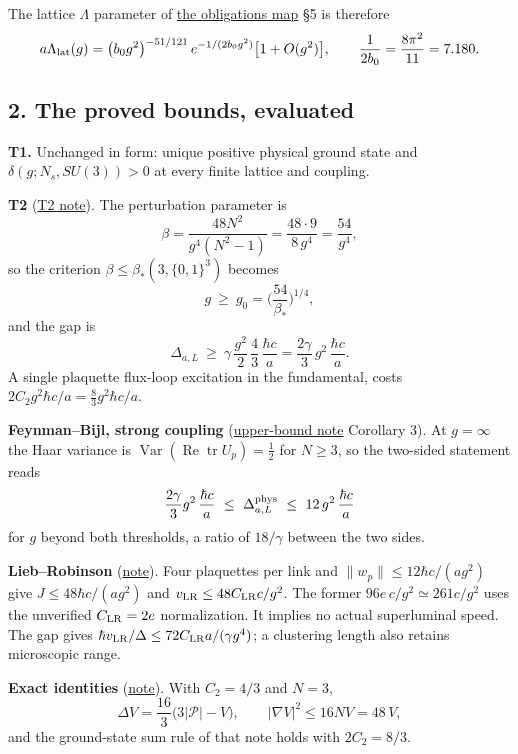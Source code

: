 \documentclass[11pt,a4paper]{article}
\begin{document}
The lattice \(\Lambda\) parameter of
\href{mass-gap-obligations-lattice.md}{the obligations map} §5 is
therefore
\[a\Lambda_{\rm lat}(g)=\big(b_0g^2\big)^{-51/121}\,e^{-1/(2b_0g^2)}\big[1+O(g^2)\big],
\qquad \frac1{2b_0}=\frac{8\pi^2}{11}=7.180 .\]

\hypertarget{the-proved-bounds-evaluated}{%
\subsection{2. The proved bounds,
evaluated}\label{the-proved-bounds-evaluated}}

\textbf{T1.} Unchanged in form: unique positive physical ground state
and \(\delta(g;N_s,SU(3))>0\) at every finite lattice and coupling.

\textbf{T2} (\href{strong-coupling-uniform-gap.md}{T2 note}). The
perturbation parameter is
\[\beta=\frac{48N^2}{g^4(N^2-1)}=\frac{48\cdot9}{8\,g^4}=\frac{54}{g^4},\]
so the criterion \(\beta\le\beta_*(3,\{0,1\}^3)\) becomes
\[g\ \ge\ g_0=\Big(\frac{54}{\beta_*}\Big)^{1/4},\] and the gap is
\[\Delta_{a,L}\ \ge\ \gamma\,\frac{g^2}{2}\,\frac43\,\frac{\hbar c}{a}
=\frac{2\gamma}{3}\,g^2\,\frac{\hbar c}{a}.\] A single plaquette
flux-loop excitation in the fundamental, costs
\(2C_2g^2\hbar c/a=\tfrac83g^2\hbar c/a\).

\textbf{Feynman--Bijl, strong coupling}
(\href{lattice-gap-upper-bounds.md}{upper-bound note} Corollary 3). At
\(g=\infty\) the Haar variance is
\(\operatorname{Var}(\operatorname{Re}\operatorname{tr}U_p)=\tfrac12\)
for \(N\ge3\), so the two-sided statement reads
\[\frac{2\gamma}{3}g^2\,\frac{\hbar c}{a}\ \le\ \Delta^{\rm phys}_{a,L}\ \le\ 12\,g^2\,\frac{\hbar c}{a}\]
for \(g\) beyond both thresholds, a ratio of \(18/\gamma\) between the
two sides.

\textbf{Lieb--Robinson} (\href{lieb-robinson-kogut-susskind.md}{note}).
Four plaquettes per link and \(\|w_p\|\le12\hbar c/(ag^2)\) give
\(J\le48\hbar c/(ag^2)\) and \(v_{\rm LR}\le48C_{\rm LR}c/g^2\). The
former \(96e\,c/g^2\simeq261c/g^2\) uses the unverified
\(C_{\rm LR}=2e\) normalization. It implies no actual superluminal
speed. The gap gives
\(\hbar v_{\rm LR}/\Delta\le72C_{\rm LR}a/(\gamma g^4)\); a clustering
length also retains microscopic range.

\textbf{Exact identities} (\href{magnetic-energy-identities.md}{note}).
With \(C_2=4/3\) and \(N=3\),
\[\Delta V=\frac{16}{3}\big(3|\mathcal P|-V\big),\qquad
|\nabla V|^2\le16NV=48\,V,\] and the ground-state sum rule of that note
holds with \(2C_2=8/3\).
\end{document}
